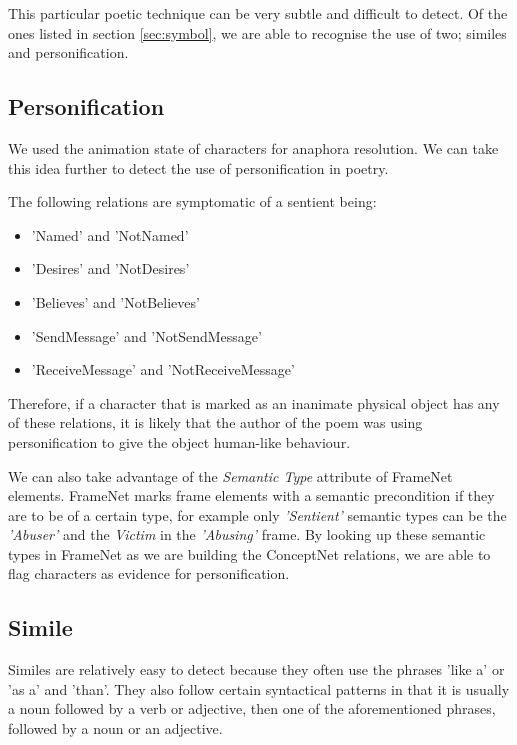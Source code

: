 This particular poetic technique can be very subtle and difficult to detect. Of the ones listed in section \ref{sec:symbol}, we are able to recognise the use of two; similes and personification.

\subsection{Personification}

We used the animation state of characters for anaphora resolution. We can take this idea further to detect the use of personification in poetry.

The following relations are symptomatic of a sentient being:

\begin{itemize}
\item{'Named' and 'NotNamed'}
\item{'Desires' and 'NotDesires'}
\item{'Believes' and 'NotBelieves'}
\item{'SendMessage' and 'NotSendMessage'}
\item{'ReceiveMessage' and 'NotReceiveMessage'}
\end{itemize}

Therefore, if a character that is marked as an inanimate physical object has any of these relations, it is likely that the author of the poem was using personification to give the object human-like behaviour.

We can also take advantage of the \textit{Semantic Type} attribute of FrameNet elements. FrameNet marks frame elements with a semantic precondition if they are to be of a certain type, for example only \textit{'Sentient'} semantic types can be the \textit{'Abuser'} and the \textit{Victim} in the \textit{'Abusing'} frame. By looking up these semantic types in FrameNet as we are building the ConceptNet relations, we are able to flag characters as evidence for personification.

\subsection{Simile}

Similes are relatively easy to detect because they often use the phrases 'like a' or 'as a' and 'than'. They also follow certain syntactical patterns in that it is usually a noun followed by a verb or adjective, then one of the aforementioned phrases, followed by a noun or an adjective.

